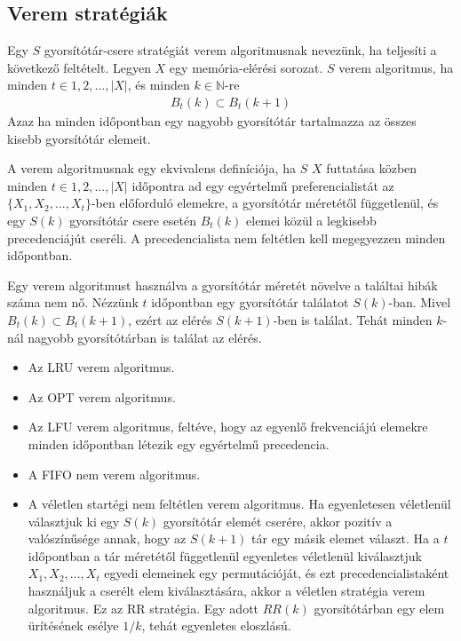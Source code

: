 \documentclass[12pt]{report}
\begin{document}
\subsection{Verem stratégiák}

Egy $S$ gyorsítótár-csere stratégiát verem algoritmusnak\cite{stack-algorithm} nevezünk,
ha teljesíti a következő feltételt.
Legyen $X$ egy memória-elérési sorozat.
$S$ verem algoritmus, ha minden $t \in {1, 2, ..., |X|}$,
és minden $k \in \mathbb{N}$-re
\begin{align*}
B_t(k) \subset B_t(k+1)
\end{align*}
Azaz ha minden időpontban egy nagyobb gyorsítótár tartalmazza
az összes kisebb gyorsítótár elemeit.

A verem algoritmusnak egy ekvivalens definíciója,
ha $S$ $X$ futtatása közben minden $t \in {1, 2, ..., |X|}$
időpontra ad egy egyértelmű
preferencialistát az $\{X_1, X_2, ..., X_t\}$-ben előforduló elemekre,
a gyorsítótár méretétől függetlenül,
és egy $S(k)$ gyorsítótár csere esetén $B_t(k)$ elemei
közül a legkisebb precedenciájút cseréli.
A precedencialista nem feltétlen kell megegyezzen minden időpontban.

Egy verem algoritmust használva a gyorsítótár
méretét növelve a találtai hibák száma nem nő.
Nézzünk $t$ időpontban egy gyorsítótár találatot $S(k)$-ban.
Mivel $B_t(k) \subset B_t(k+1)$,
ezért az elérés $S(k+1)$-ben is találat.
Tehát minden $k$-nál nagyobb gyorsítótárban is találat az elérés.

\begin{itemize}
\item Az LRU verem algoritmus.
\item Az OPT verem algoritmus.
\item Az LFU verem algoritmus, feltéve,
hogy az egyenlő frekvenciájú elemekre
minden időpontban létezik egy egyértelmű precedencia.
\item A FIFO nem verem algoritmus.
\item A véletlen startégi nem feltétlen verem algoritmus.
Ha egyenletesen véletlenül választjuk ki egy $S(k)$ gyorsítótár elemét cserére,
akkor pozitív a valószínűsége annak, hogy az $S(k+1)$ tár egy másik elemet választ.
Ha a $t$ időpontban a tár méretétől függetlenül egyenletes véletlenül
kiválasztjuk ${X_1, X_2, ..., X_t}$ egyedi elemeinek egy permutációját,
és ezt precedencialistaként használjuk a cserélt elem kiválasztására,
akkor a véletlen stratégia verem algoritmus.\cite{stack-algorithm}
Ez az RR stratégia.
Egy adott $RR(k)$ gyorsítótárban egy elem ürítésének esélye $1/k$, tehát egyenletes eloszlású.
\end{itemize}
\end{document}
